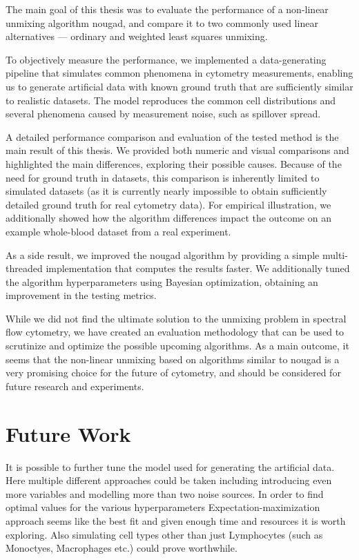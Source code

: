 
The main goal of this thesis was to evaluate the performance of a non-linear unmixing algorithm nougad, and compare it to two commonly used linear alternatives --- ordinary and weighted least squares unmixing. 

To objectively measure the performance, we implemented a data-generating pipeline that simulates common phenomena in cytometry measurements, enabling us to generate artificial data with known ground truth that are sufficiently similar to realistic datasets. The model reproduces the common cell distributions and several phenomena caused by measurement noise, such as spillover spread.

A detailed performance comparison and evaluation of the tested method is the main result of this thesis. We provided both numeric and visual comparisons and highlighted the main differences, exploring their possible causes. Because of the need for ground truth in datasets, this comparison is inherently limited to simulated datasets (as it is currently nearly impossible to obtain sufficiently detailed ground truth for real cytometry data). For empirical illustration, we additionally showed how the algorithm differences impact the outcome on an example whole-blood dataset from a real experiment.

As a side result, we improved the nougad algorithm by providing a simple multi-threaded implementation that computes the results faster. We additionally tuned the algorithm hyperparameters using Bayesian optimization, obtaining an improvement in the testing metrics.

While we did not find the ultimate solution to the unmixing problem in spectral flow cytometry, we have created an evaluation methodology that can be used to scrutinize and optimize the possible upcoming algorithms. As a main outcome, it seems that the non-linear unmixing based on algorithms similar to nougad is a very promising choice for the future of cytometry, and should be considered for future research and experiments.

\section*{Future Work}

It is possible to further tune the model used for generating the artificial data. Here multiple different approaches could be taken including introducing even more variables and modelling more than two noise sources. In order to find optimal values for the various hyperparameters Expectation-maximization approach seems like the best fit and given enough time and resources it is worth exploring. Also simulating cell types other than just Lymphocytes (such as Monoctyes, Macrophages etc.) could prove worthwhile.


